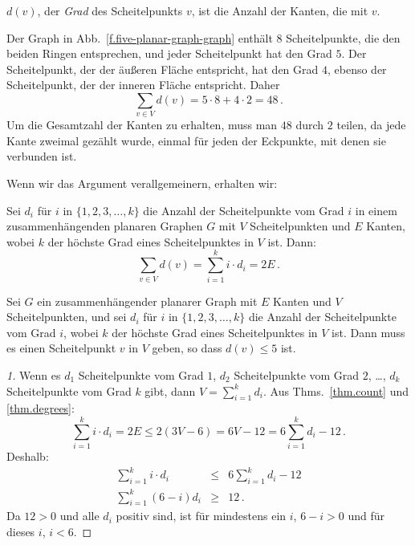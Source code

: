 \begin{definition}
$d(v)$, der \emph{Grad} des Scheitelpunkts $v$, ist die Anzahl der Kanten, die mit $v$.
\end{definition}

\begin{example}
Der Graph in Abb.~\ref{f.five-planar-graph-graph} enthält $8$ Scheitelpunkte, die den beiden Ringen entsprechen, und jeder Scheitelpunkt hat den Grad $5$. Der Scheitelpunkt, der der äußeren Fläche entspricht, hat den Grad $4$, ebenso der Scheitelpunkt, der der inneren Fläche entspricht. Daher
\[
\sum_{v\in V} d(v) = 5\cdot 8 + 4\cdot 2=48\,.
\]
Um die Gesamtzahl der Kanten zu erhalten, muss man $48$ durch $2$ teilen, da jede Kante zweimal gezählt wurde, einmal für jeden der Eckpunkte, mit denen sie verbunden ist.
\end{example}

Wenn wir das Argument verallgemeinern, erhalten wir:
\begin{theorem}\label{thm.degrees}
Sei $d_i$ für $i$ in $\{1,2,3,\ldots,k\}$ die Anzahl der Scheitelpunkte vom Grad $i$ in einem zusammenhängenden planaren Graphen $G$ mit $V$ Scheitelpunkten und $E$ Kanten, wobei $k$ der höchste Grad eines Scheitelpunktes in $V$ ist. Dann:
\[
\sum_{v\in V} d(v) =\sum_{i=1}^{k} i\cdot d_i=2E\,.
\]
\end{theorem}

\begin{theorem}\label{thm.degree5}
Sei $G$ ein zusammenhängender planarer Graph mit $E$ Kanten und $V$ Scheitelpunkten, und sei $d_i$ für $i$ in $\{1,2,3,\ldots,k\}$ die Anzahl der Scheitelpunkte vom Grad $i$, wobei $k$ der höchste Grad eines Scheitelpunktes in $V$ ist. Dann muss es einen Scheitelpunkt $v$ in $V$ geben, so dass $d(v) \leq 5$ ist.
\end{theorem}

\begin{proof}[1]
Wenn es $d_1$ Scheitelpunkte vom Grad $1$, $d_2$ Scheitelpunkte vom Grad $2$, \ldots, $d_k$ Scheitelpunkte vom Grad $k$ gibt, dann $V=\sum_{i=1}^{k}d_i$.  Aus Thms.~\ref{thm.count} und \ref{thm.degrees}:
\[
\sum_{i=1}^{k} i\cdot d_i=2E\leq 2(3V-6) = 6V-12=6\sum_{i=1}^{k} d_i -12\,.
\]
Deshalb:
\begin{eqnarray*}
\sum_{i=1}^{k} i\cdot d_i &\leq& 6\sum_{i=1}^{k} d_i -12\\
\sum_{i=1}^{k} (6-i)d_i&\geq& 12\,.
\end{eqnarray*}
Da $12>0$ und alle $d_i$ positiv sind, ist für mindestens ein $i$, $6-i>0$ und für dieses $i$, $i<6$.
\end{proof}

